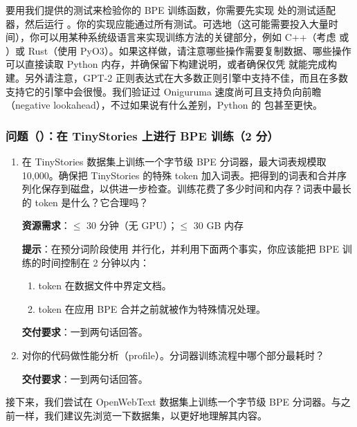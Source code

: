 要用我们提供的测试来检验你的 BPE 训练函数，你需要先实现  处的测试适配器，然后运行 。你的实现应能通过所有测试。可选地（这可能需要投入大量时间），你可以用某种系统级语言来实现训练方法的关键部分，例如 C++（考虑  或 ）或 Rust（使用 PyO3）。如果这样做，请注意哪些操作需要复制数据、哪些操作可以直接读取 Python 内存，并确保留下构建说明，或者确保仅凭  就能完成构建。另外请注意，GPT-2 正则表达式在大多数正则引擎中支持不佳，而且在多数支持它的引擎中会很慢。我们验证过 Oniguruma 速度尚可且支持负向前瞻（negative lookahead），不过如果说有什么差别，Python 的  包甚至更快。

\subsubsection*{问题（）：在 TinyStories 上进行 BPE 训练（2 分）}

\begin{enumerate}[label=(\alph*)]
  \item 在 TinyStories 数据集上训练一个字节级 BPE 分词器，最大词表规模取 10,000。确保把 TinyStories 的特殊 token  加入词表。把得到的词表和合并序列化保存到磁盘，以供进一步检查。训练花费了多少时间和内存？词表中最长的 token 是什么？它合理吗？

        \textbf{资源需求}：$\leq$ 30 分钟（无 GPU）；$\leq$ 30 GB 内存

        \textbf{提示}：在预分词阶段使用  并行化，并利用下面两个事实，你应该能把 BPE 训练的时间控制在 2 分钟以内：
        \begin{enumerate}[label=(\alph*)]
          \item {} token 在数据文件中界定文档。
          \item {} token 在应用 BPE 合并之前就被作为特殊情况处理。
        \end{enumerate}

        \textbf{交付要求}：一到两句话回答。

  \item 对你的代码做性能分析（profile）。分词器训练流程中哪个部分最耗时？

        \textbf{交付要求}：一到两句话回答。
\end{enumerate}

接下来，我们尝试在 OpenWebText 数据集上训练一个字节级 BPE 分词器。与之前一样，我们建议先浏览一下数据集，以更好地理解其内容。


